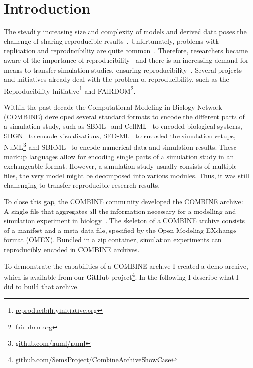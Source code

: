 
\section{Introduction}
\label{sec:intro}

The steadily increasing size and complexity of models and derived data poses the challenge of sharing reproducible results~\cite{scharm2014}.
Unfortunately, problems with replication and reproducibility are quite common~\cite{Prinz2011,repmicro,drugdevprob}.
Therefore, researchers became aware of the importance of reproducibility~\cite{Sandve2013} and
there is an increasing demand for means to transfer simulation studies, ensuring reproducibility~\cite{workflowobjects,researchobjects,Bergmann2014}.
% 
% 
% 
Several projects and initiatives already deal with the problem of reproducibility, such as the Reproducibility Initiative\footnote{\href{http://reproducibilityinitiative.org/}{reproducibilityinitiative.org}} and FAIRDOM\footnote{\href{http://fair-dom.org/}{fair-dom.org}}.

Within the past decade the Computational Modeling in Biology Network (COMBINE) developed several standard formats to encode the different parts of a simulation study, such as SBML~\cite{Hucka2003} and CellML~\cite{Cuellar2003a} to encoded biological systems, SBGN~\cite{sbgn} to encode visualisations, SED-ML~\cite{Waltemath2011} to encoded the simulation setups, NuML\footnote{\href{https://github.com/numl/numl}{github.com/numl/numl}} and SBRML~\cite{Dada2010} to encode numerical data and simulation results.
These markup languages allow for encoding single parts of a simulation study in an exchangeable format.
However, a simulation study usually consists of multiple files, the very model might be decomposed into various modules.
Thus, it was still challenging to transfer reproducible research results.

To close this gap, the COMBINE community developed the COMBINE archive:
A single file that aggregates all the information necessary for a modelling and simulation experiment in biology~\cite{Bergmann2014}.
The skeleton of a COMBINE archive consists of a manifest and a meta data file, specified by the Open Modeling EXchange format (OMEX).
Bundled in a zip container, simulation experiments can reproducibly encoded in COMBINE archives.

To demonstrate the capabilities of a COMBINE archive I created a demo archive, which is available from our GitHub project\footnote{\href{https://github.com/SemsProject/CombineArchiveShowCase}{github.com/SemsProject/CombineArchiveShowCase}}.
In the following I describe what I did to build that archive.

